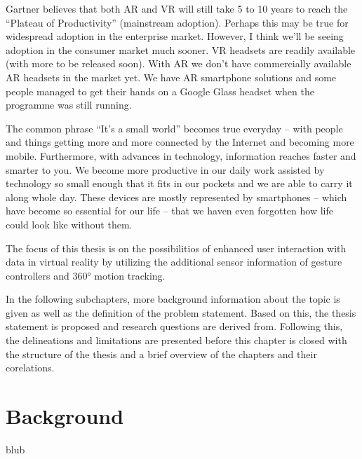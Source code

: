 Gartner believes that both AR and VR will still take 5 to 10 years to reach the “Plateau of Productivity” (mainstream adoption). Perhaps this may be true for widespread adoption in the enterprise market. However, I think we’ll be seeing adoption in the consumer market much sooner. VR headsets are readily available (with more to be released soon). With AR we don’t have commercially available AR headsets in the market yet. We have AR smartphone solutions and some people managed to get their hands on a Google Glass headset when the programme was still running.



The common phrase “It’s a small world” becomes true everyday – with people and things getting more and more connected by the Internet and becoming more mobile. Furthermore, with advances in technology, information reaches faster and smarter to you. We become more productive in our daily work assisted by technology so small enough that it fits in our pockets and we are able to carry it along whole day. These devices are mostly represented by smartphones – which have become so essential for our life – that we haven even forgotten how life could look like without them.








The focus of this thesis is on the possibilitios of enhanced user interaction with data in virtual reality by utilizing the additional sensor information of gesture controllers and 360° motion tracking.

In the following subchapters, more background information about the topic is given as well as the definition of the problem statement. Based on this, the thesis statement is proposed and research questions are derived from. Following this, the delineations and limitations are presented before this chapter is closed with the structure of the thesis and a brief overview of the chapters and their corelations.



\section{Background}

blub



